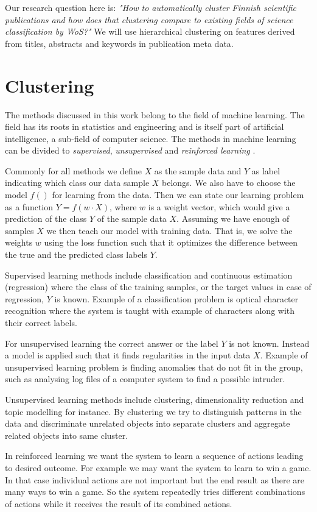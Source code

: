 Our research question here is: \emph{"How to automatically cluster 
Finnish scientific publications and how does that clustering 
compare to existing fields of science classification by WoS?"} We 
will use hierarchical clustering on features derived from titles,
abstracts and keywords in publication meta data.


\section{Clustering}
The methods discussed in this work belong to the field of machine 
learning. The field has its roots in statistics and engineering 
and is itself part of artificial intelligence, a sub-field of 
computer science.
The methods in machine learning can be divided to \emph{supervised}, 
\emph{unsupervised} and \emph{reinforced learning}
\cite{alpaydin2004introduction}.

Commonly for all methods we define $X$ as
the sample data and $Y$ as label indicating which class our data 
sample $X$ belongs. We also have to choose the model $f()$ for
learning from the data. Then we can state our learning problem as
a function $Y = f(w \cdot X)$, where $w$ is a weight vector, 
which would give a prediction of the class $Y$ of the sample data
$X$. 
Assuming we have enough of samples $X$ we then teach our model 
with training data. That is, we solve the weights $w$ using the
loss function such that it optimizes the difference between the 
true and the predicted class labels $Y$.

Supervised learning methods include classification and continuous 
estimation (regression)
where the class of the training samples, or the target values in 
case of regression, $Y$ is known. Example of a classification 
problem is optical character recognition where the system is 
taught with example of characters along with their correct labels.

For unsupervised learning the correct answer or the label $Y$ is not known. 
Instead a model is applied such that it finds regularities in the
input data $X$. Example of unsupervised learning problem is 
finding anomalies that do not fit in the group, such as analysing
log files of a computer system to find a possible intruder.

Unsupervised learning methods include clustering, dimensionality
reduction and topic modelling for instance. By clustering we try to 
distinguish patterns in the data and discriminate unrelated 
objects into separate clusters and aggregate related objects into
same cluster.

In reinforced learning we want the system to learn a sequence of
actions leading to desired outcome. For example we may want the 
system to learn to win a game. In that case individual actions
are not important but the end result as there are many ways to win
a game. So the system repeatedly tries different combinations of
actions while it receives the result of its combined actions.


